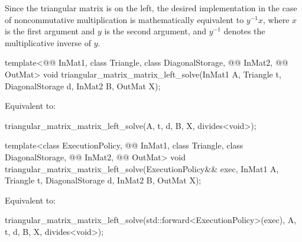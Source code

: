 \pnum
\begin{note}
Since the triangular matrix is on the left,
the desired  implementation
in the case of noncommutative multiplication
is mathematically equivalent to $y^{-1} x$,
where $x$ is the first argument and $y$ is the second argument,
and $y^{-1}$ denotes the multiplicative inverse of $y$.
\end{note}

%
\begin{itemdecl}
template<@@ InMat1, class Triangle, class DiagonalStorage,
         @@ InMat2, @@ OutMat>
  void triangular_matrix_matrix_left_solve(InMat1 A, Triangle t, DiagonalStorage d,
                                           InMat2 B, OutMat X);
\end{itemdecl}

\begin{itemdescr}
\pnum
\effects
Equivalent to:
\begin{codeblock}
triangular_matrix_matrix_left_solve(A, t, d, B, X, divides<void>{});
\end{codeblock}
\end{itemdescr}

%
\begin{itemdecl}
template<class ExecutionPolicy, @@ InMat1, class Triangle, class DiagonalStorage,
         @@ InMat2, @@ OutMat>
  void triangular_matrix_matrix_left_solve(ExecutionPolicy&& exec,
                                           InMat1 A, Triangle t, DiagonalStorage d,
                                           InMat2 B, OutMat X);
\end{itemdecl}

\begin{itemdescr}
\pnum
\effects
Equivalent to:
\begin{codeblock}
triangular_matrix_matrix_left_solve(std::forward<ExecutionPolicy>(exec),
                                    A, t, d, B, X, divides<void>{});
\end{codeblock}
\end{itemdescr}

